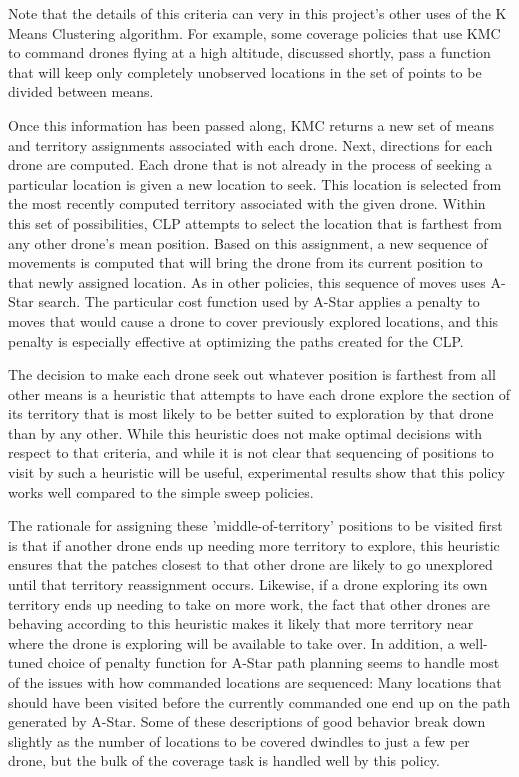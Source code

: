 Note that the details of this criteria can very in this project's other uses of the K Means Clustering algorithm. For example, some coverage policies that use KMC to command drones flying at a high altitude, discussed shortly, pass a function that will keep only completely unobserved locations in the set of points to be divided between means.

Once this information has been passed along, KMC returns a new set of means and territory assignments associated with each drone. Next, directions for each drone are computed. Each drone that is not already in the process of seeking a particular location is given a new location to seek. This location is selected from the most recently computed territory associated with the given drone. Within this set of possibilities, CLP attempts to select the location that is farthest from any other drone's mean position. Based on this assignment, a new sequence of movements is computed that will bring the drone from its current position to that newly assigned location. As in other policies, this sequence of moves uses A-Star search. The particular cost function used by A-Star applies a penalty to moves that would cause a drone to cover previously explored locations, and this penalty is especially effective at optimizing the paths created for the CLP.

The decision to make each drone seek out whatever position is farthest from all other means is a heuristic that attempts to have each drone explore the section of its territory that is most likely to be better suited to exploration by that drone than by any other. While this heuristic does not make optimal decisions with respect to that criteria, and while it is not clear that sequencing of positions to visit by such a heuristic will be useful, experimental results show that this policy works well compared to the simple sweep policies.

The rationale for assigning these 'middle-of-territory' positions to be visited first is that if another drone ends up needing more territory to explore, this heuristic ensures that the patches closest to that other drone are likely to go unexplored until that territory reassignment occurs. Likewise, if a drone exploring its own territory ends up needing to take on more work, the fact that other drones are behaving according to this heuristic makes it likely that more territory near where the drone is exploring will be available to take over. In addition, a well-tuned choice of penalty function for A-Star path planning seems to handle most of the issues with how commanded locations are sequenced: Many locations that should have been visited before the currently commanded one end up on the path generated by A-Star. Some of these descriptions of good behavior break down slightly as the number of locations to be covered dwindles to just a few per drone, but the bulk of the coverage task is handled well by this policy.

